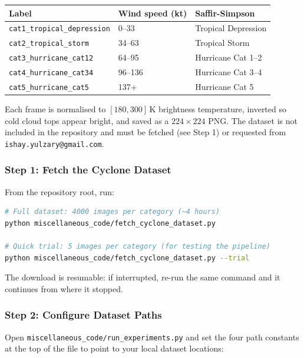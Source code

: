 \documentclass[12pt,a4paper]{article}
\begin{document}
\begin{center}
\begin{tabular}{lll}
\toprule
\textbf{Label} & \textbf{Wind speed (kt)} & \textbf{Saffir-Simpson} \\
\midrule
\texttt{cat1\_tropical\_depression} & 0--33   & Tropical Depression \\
\texttt{cat2\_tropical\_storm}      & 34--63  & Tropical Storm \\
\texttt{cat3\_hurricane\_cat12}     & 64--95  & Hurricane Cat 1--2 \\
\texttt{cat4\_hurricane\_cat34}     & 96--136 & Hurricane Cat 3--4 \\
\texttt{cat5\_hurricane\_cat5}      & 137+    & Hurricane Cat 5 \\
\bottomrule
\end{tabular}
\end{center}

Each frame is normalised to $[180, 300]\,\text{K}$ brightness temperature,
inverted so cold cloud tops appear bright, and saved as a
$224\times224$ PNG. The dataset is not included in the repository and
must be fetched (see Step 1) or requested from
\texttt{ishay.yulzary@gmail.com}.

\subsubsection{Step 1: Fetch the Cyclone Dataset}

From the repository root, run:

\begin{lstlisting}[language=bash]
# Full dataset: 4000 images per category (~4 hours)
python miscellaneous_code/fetch_cyclone_dataset.py

# Quick trial: 5 images per category (for testing the pipeline)
python miscellaneous_code/fetch_cyclone_dataset.py --trial
\end{lstlisting}

The download is resumable: if interrupted, re-run the same command and it
continues from where it stopped.

\subsubsection{Step 2: Configure Dataset Paths}

Open \texttt{miscellaneous\_code/run\_experiments.py} and set the four
path constants at the top of the file to point to your local dataset
locations:
\end{document}
